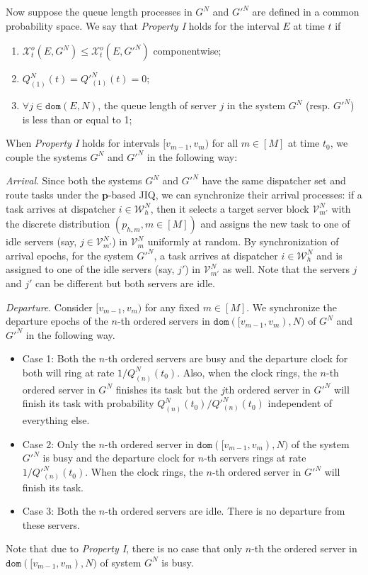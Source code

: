 \documentclass[11pt, reqno]{article}
\numberwithin{equation}{section}
\numberwithin{theorem}{section}
\newcommand{\dom}{\texttt{dom}}
\begin{document}
Now suppose the queue length processes in $G^N$ and $G'^N$ are defined in a common probability space.
We say that \textit{Property I} holds for the interval $E$ at time $t$ if 
\begin{enumerate}[\normalfont(i)]
\item $\mathcal{X}^o_t(E,G^N)\leq \mathcal{X}^o_t(E,G'^N)$ componentwise;
\item $Q^N_{(1)}(t)=Q'^N_{(1)}(t)=0$;
\item $\forall j\in\dom(E,N)$, the queue length of server $j$ in the system $G^N$ (resp. $G'^N$) is less than or equal to 1; 
\end{enumerate}
When \textit{Property I} holds for intervals $[v_{m-1},v_m)$ for all $m\in[M]$ at time $t_0$, 
we couple the systems $G^N$ and $G'^N$ in the following way: 
\vspace{.2cm}

\noindent
\textit{Arrival}. Since both the systems $G^N$ and $G'^N$ have the same dispatcher set and route tasks under the $\mathbf{p}$-based JIQ, 
we can synchronize their arrival processes: 
if a task arrives at dispatcher $i\in\mathcal{W}^N_h$, then it selects a target server block $\mathcal{V}^N_{m'}$ with the discrete distribution $(p_{h,m},m\in[M])$ and assigns the new task to one of idle servers (say, $j\in\mathcal{V}^N_{m'}$) in $\mathcal{V}^N_m$ uniformly at random.
By synchronization of arrival epochs, for the system $G'^N$, a task arrives at dispatcher $i\in \mathcal{W}^N_h$ and is assigned to one of the idle servers (say, $j'$) in $\mathcal{V}^N_{m'}$ as well. 
Note that the servers $j$ and $j'$ can be different but both servers are idle.
\vspace{.2cm}

\noindent
\textit{Departure}. Consider $[v_{m-1},v_m)$ for any fixed $m\in[M]$. We synchronize the departure epochs of the $n$-th ordered servers in $\dom([v_{m-1},v_m),N)$ of $G^N$ and $G'^N$ in the following way. 
\begin{itemize}
    \item Case 1: Both the $n$-th ordered servers are busy and the departure clock  for both will ring at rate $1/Q^N_{(n)}(t_0)$. 
    Also, when the clock rings, the $n$-th ordered server in $G^N$  finishes its task but the $j$th ordered server in $G'^N$ will finish its task with probability $Q^N_{(n)}(t_0)/Q'^N_{(n)}(t_0)$ independent of everything else.

    \item Case 2: Only the $n$-th ordered server in $\dom([v_{m-1},v_m),N)$ of the system $G'^N$ is busy and the departure clock for $n$-th servers rings at rate $1/Q'^N_{(n)}(t_0)$.  
    When the clock rings, the $n$-th ordered server in $G'^N$ will finish its task.

    \item Case 3: Both the $n$-th ordered servers are idle. There is no departure from these servers. 
\end{itemize}
Note that due to \textit{Property I}, there is no case that only $n$-th the ordered server in $\dom([v_{m-1},v_m),N)$ of system $G^N$ is busy.
\vspace{.2cm}
\end{document}
